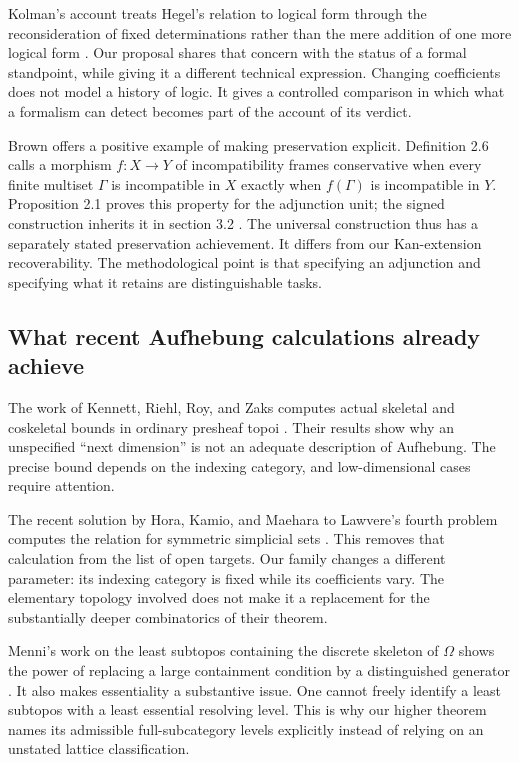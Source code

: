Kolman's account treats Hegel's relation to logical form through the
reconsideration of fixed determinations rather than the mere addition of
one more logical form \cite{Kolman}. Our proposal shares that concern
with the status of a formal standpoint, while giving it a different
technical expression. Changing coefficients does not model a history of
logic. It gives a controlled comparison in which what a formalism can
detect becomes part of the account of its verdict.

Brown offers a positive example of making preservation explicit.
Definition 2.6 calls a morphism $f:X\to Y$ of incompatibility frames
conservative when every finite multiset $\Gamma$ is incompatible in $X$
exactly when $f(\Gamma)$ is incompatible in $Y$. Proposition 2.1 proves
this property for the adjunction unit; the signed construction inherits
it in section 3.2 \cite{Brown}. The universal construction thus has a
separately stated preservation achievement. It differs from our
Kan-extension recoverability. The methodological point is that specifying
an adjunction and specifying what it retains are distinguishable tasks.

\subsection{What recent Aufhebung calculations already achieve}

The work of Kennett, Riehl, Roy, and Zaks computes actual skeletal and
coskeletal bounds in ordinary presheaf topoi \cite{KennettEtAl}. Their
results show why an unspecified ``next dimension'' is not an adequate
description of Aufhebung. The precise bound depends on the indexing
category, and low-dimensional cases require attention.

The recent solution by Hora, Kamio, and Maehara to Lawvere's fourth
problem computes the relation for symmetric simplicial sets
\cite{HoraEtAl}. This removes that calculation from the list of open
targets. Our family changes a different parameter: its indexing category
is fixed while its coefficients vary. The elementary topology involved
does not make it a replacement for the substantially deeper combinatorics
of their theorem.

Menni's work on the least subtopos containing the discrete skeleton of
$\Omega$ shows the power of replacing a large containment condition by
a distinguished generator \cite{Menni}. It also makes essentiality a
substantive issue. One cannot freely identify a least subtopos with a
least essential resolving level. This is why our higher theorem names
its admissible full-subcategory levels explicitly instead of relying on
an unstated lattice classification.

